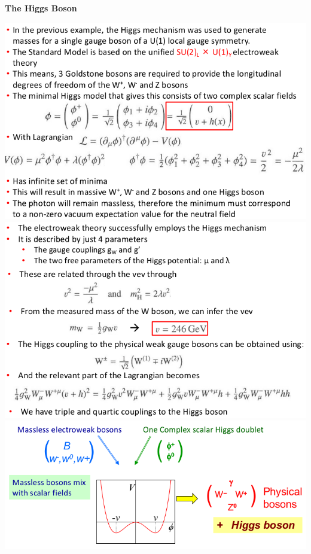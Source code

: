 \textbf{The Higgs Boson}

\begin{center}
    \includegraphics[width=\linewidth]{images/higgs_intro.png}
    \includegraphics[width=\linewidth]{images/higgs_intro_2.png}
    \includegraphics[width=\linewidth]{images/higgs_3.png}

\end{center}
